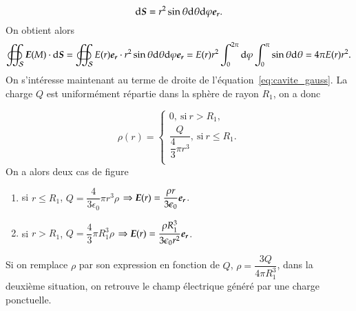 \begin{equation}
	\ds = r^2 \sin \theta \dtheta \dphi \er.
\end{equation}
On obtient alors
\begin{equation}
	\oiint_\mathcal{S} \vece(M) \cdot \ds = 
	\oiint_\mathcal{S} E(r) \er \cdot r^2 \sin \theta \dtheta \dphi \er
	= E(r) r^2 \int_0^{2 \pi} \dphi \int_0^\pi\sin \theta \dtheta
	= 4 \pi E(r) r^2.
\end{equation}
On s'intéresse maintenant au terme de droite de l'équation~\ref{eq:cavite_gauss}.
La charge $Q$ est uniformément répartie dans la sphère de rayon $R_1$, on a donc

\begin{equation}
	\rho(r) = 
	\left\{
	\begin{array}{l}
		0,\ \mathrm{si} \  r > R_1,\\[1em]
		\dfrac{Q}{\dfrac{4}{3} \pi r^3},\ \mathrm{si} \ r \leq R_1. \\
	\end{array}
	\right.
\end{equation}
On a alors deux cas de figure
\begin{enumerate}
	\item si $r \leq R_1$, $Q = \dfrac{4}{3 \epsilon_0} \pi r^3 \rho$
	  $\Rightarrow \vece(r) = \dfrac{\rho r}{3 \epsilon_0} \er$.
	\item si $r > R_1$, $Q = \dfrac{4}{3} \pi R_1^3 \rho$ 
	  $\Rightarrow \vece(r) = \dfrac{\rho R_1^3}{3 \epsilon_0 r^2} \er$.
\end{enumerate}

\begin{rem}
	Si on remplace $\rho$ par son expression en fonction de $Q$, 
	$\rho = \dfrac{3Q}{4 \pi R_1^3}$, dans la deuxième 
	situation, on retrouve le champ électrique généré par une charge ponctuelle.
\end{rem}
